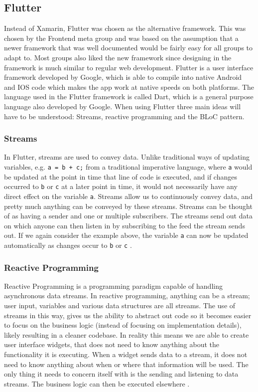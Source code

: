 \subsection{Flutter} \label{SEC:Flutter}
Instead of Xamarin, Flutter was chosen as the alternative framework.
This was chosen by the Frontend meta group and was based on the assumption that a newer framework that was well documented would be fairly easy for all groups to adapt to. 
Most groups also liked the new framework since designing in the framework is much similar to regular web development. 
Flutter is a user interface framework developed by Google, which is able to compile into native Android and IOS code which makes the app work at native speeds on both platforms. 
The language used in the Flutter framework is called Dart, which is a general purpose language also developed by Google.
When using Flutter three main ideas will have to be understood:
Streams, reactive programming and the BLoC pattern.

\subsubsection{Streams}
In Flutter, streams are used to convey data.
Unlike traditional ways of updating variables, e.g. \lstinline$a = b + c;$ from a traditional imperative language, where \lstinline$a$ would be updated at the point in time that line of code is executed, and if changes occurred to \lstinline{b} or \lstinline{c} at a later point in time, it would not necessarily have any direct effect on the variable \lstinline$a$.
Streams allow us to continuously convey data, and pretty much anything can be conveyed by these streams.
Streams can be thought of as having a sender and one or multiple subscribers.
The streams send out data on which anyone can then listen in by subscribing to the feed the stream sends out.
If we again consider the example above, the variable \lstinline$a$ can now be updated automatically as changes occur to \lstinline$b$ or \lstinline$c$ \cite{Flutterintro}.
\subsubsection{Reactive Programming}
Reactive Programming is a programming paradigm capable of handling asynchronous data streams. 
In reactive programming, anything can be a stream; user input, variables and various data structures are all streams. 
The use of streams in this way, gives us the ability to abstract out code so it becomes easier to focus on the business logic (instead of focusing on implementation details), likely resulting in a cleaner codebase.
In reality this means we are able to create user interface widgets, that does not need to know anything about the functionality it is executing. 
When a widget sends data to a stream, it does not need to know anything about when or where that information will be used. 
The only thing it needs to concern itself with is the sending and listening to data streams. 
The business logic can then be executed elsewhere \cite{ReactiveProg}.
